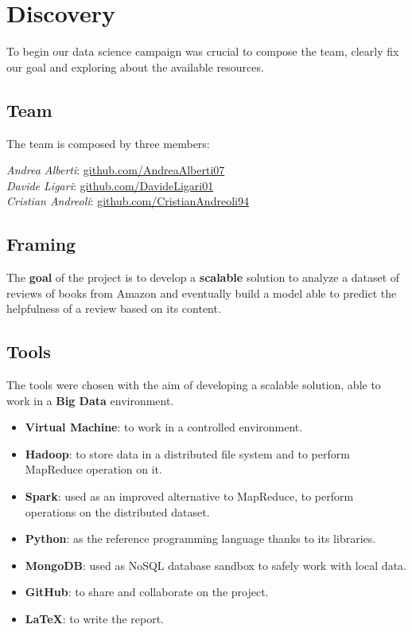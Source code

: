 \section{Discovery}
To begin our data science campaign was crucial to compose the team, clearly fix our goal and exploring about the available resources.

\subsection{Team}
The team is composed by three members:

\noindent
\textit{Andrea Alberti}: \href{https://github.com/AndreaAlberti07}{github.com/AndreaAlberti07}\\
\textit{Davide Ligari}: \href{https://github.com/DavideLigari01}{github.com/DavideLigari01}\\
\textit{Cristian Andreoli}: \href{https://github.com/CristianAndreoli94}{github.com/CristianAndreoli94}\\
    
\subsection{Framing}
The \textbf{goal} of the project is to develop a \textbf{scalable} solution to analyze a dataset of reviews of books from Amazon and
eventually build a model able to predict the helpfulness of a review based on its content.

\subsection{Tools}
The tools were chosen with the aim of developing a scalable solution, able to work in a \textbf{Big Data} environment.

\begin{itemize}[leftmargin=*, noitemsep]
    \item \textbf{Virtual Machine}: to work in a controlled environment.
    \item \textbf{Hadoop}: to store data in a distributed file system and to perform MapReduce operation on it.
    \item \textbf{Spark}: used as an improved alternative to MapReduce, to perform operations on the distributed dataset.
    \item \textbf{Python}: as the reference programming language thanks to its libraries.
    \item \textbf{MongoDB}: used as NoSQL database sandbox to safely work with local data.
    \item \textbf{GitHub}: to share and collaborate on the project.
    \item \textbf{LaTeX}: to write the report.
\end{itemize}




